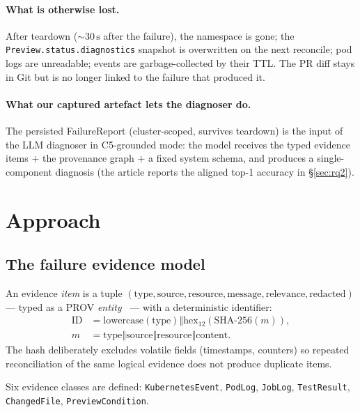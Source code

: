 \documentclass[sigconf, nonacm=true, anonymous=false, review=false]{acmart}
\newcommand{\fp}{FailureReport\xspace}
\newcommand{\Cn}[1]{C#1\xspace}
\begin{document}
\paragraph{What is otherwise lost.} After teardown
($\sim 30\,\text{s}$ after the failure), the namespace is gone; the
\texttt{Preview.status.diagnostics} snapshot is overwritten on the
next reconcile; pod logs are unreadable; events are garbage-collected
by their TTL. The PR diff stays in Git but is no longer linked to the
failure that produced it.

\paragraph{What our captured artefact lets the diagnoser do.}
The persisted \fp{} (cluster-scoped, survives teardown) is the input
of the LLM diagnoser in \Cn{5}-grounded mode: the model receives the
typed evidence items + the provenance graph + a fixed system schema,
and produces a single-component diagnosis (the article reports the
aligned top-1 accuracy in \S\ref{sec:rq2}).

\section{Approach}
\label{sec:approach}

\subsection{The failure evidence model}
\label{sec:approach-evidence}

An evidence \emph{item} is a tuple
$(\text{type}, \text{source}, \text{resource}, \text{message},
\text{relevance}, \text{redacted})$ --- typed as a PROV
\emph{entity}~\cite{lebo_provo_2013} --- with a deterministic
identifier:
\[
\begin{aligned}
\mathrm{ID} &= \mathrm{lowercase(type)} \mathbin{\Vert}
  \mathrm{hex}_{12}\!\left(\mathrm{SHA\mbox{-}256}(m)\right),\\
m &= \mathrm{type} \mathbin{\Vert} \mathrm{source} \mathbin{\Vert}
  \mathrm{resource} \mathbin{\Vert} \mathrm{content}.
\end{aligned}
\]
The hash deliberately excludes volatile fields (timestamps, counters)
so repeated reconciliation of the same logical evidence does not
produce duplicate items.

Six evidence classes are defined: \texttt{KubernetesEvent},
\texttt{PodLog}, \texttt{JobLog}, \texttt{TestResult},
\texttt{ChangedFile}, \texttt{PreviewCondition}.
\end{document}
